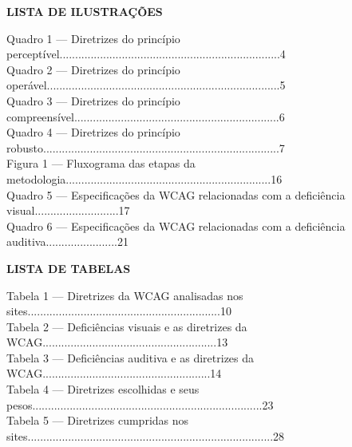 \documentclass[a4paper]{article}
\begin{document}
\begin{titlepage}
	\begin{center}
		{\large \textbf{LISTA DE ILUSTRAÇÕES}}\\[1cm]
	\end{center}
	Quadro 1 — Diretrizes do princípio perceptível.......................................................................\hspace{0.4cm}4\\[0.5cm]
	Quadro 2 — Diretrizes do princípio operável...........................................................................\hspace{0.4cm}5\\[0.5cm]
	Quadro 3 — Diretrizes do princípio compreensível..................................................................\hspace{0.4cm}6\\[0.5cm]
	Quadro 4 — Diretrizes do princípio robusto............................................................................\hspace{0.4cm}7\\[0.5cm]
	Figura 1 — Fluxograma das etapas da metodologia..................................................................\hspace{0.2cm}16\\[0.5cm]
	Quadro 5 — Especificações da WCAG relacionadas com a deficiência visual...........................\hspace{0.2cm}17\\[0.5cm]
	Quadro 6 — Especificações da WCAG relacionadas com a deficiência auditiva.......................\hspace{0.2cm}21\\[0.5cm]
\end{titlepage}

\begin{titlepage}
	\begin{center}
		{\large \textbf{LISTA DE TABELAS}}\\[1cm]
	\end{center}
	Tabela 1 — Diretrizes da WCAG analisadas nos sites..............................................................\hspace{0.2cm}10\\[0.5cm]
	Tabela 2 — Deficiências visuais e as diretrizes da WCAG........................................................\hspace{0.2cm}13\\[0.5cm]
	Tabela 3 — Deficiências auditiva e as diretrizes da WCAG......................................................\hspace{0.2cm}14\\[0.5cm]
	Tabela 4 — Diretrizes escolhidas e seus pesos..........................................................................\hspace{0.2cm}23\\[0.5cm]
	Tabela 5 — Diretrizes cumpridas nos sites...............................................................................\hspace{0.2cm}28\\[0.5cm]
\end{titlepage}
\end{document}
